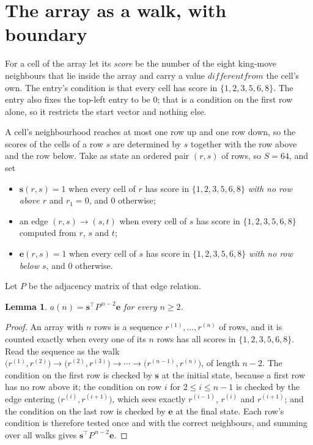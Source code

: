 \documentclass[11pt,a4paper]{article}
\theoremstyle{plain}
\newtheorem{lemma}[theorem]{Lemma}
\theoremstyle{definition}
\begin{document}
\section{The array as a walk, with boundary}

For a cell of the array let its \emph{score} be the number of the eight king-move neighbours that lie inside
the array and carry a value $different from$ the cell's own. The entry's condition is that every cell
has score in $\{1,2,3,5,6,8\}$. The entry also fixes the top-left entry to be $0$; that is a condition on the first row alone, so it restricts the start vector and nothing else.

A cell's neighbourhood reaches at most one row up and one row down, so the scores of the
cells of a row $s$ are determined by $s$ together with the row above and the row below.
Take as state an ordered pair $(r,s)$ of rows, so $S=64$, and set
\begin{itemize}
\item $\mathbf{s}(r,s)=1$ when every cell of $r$ has score in $\{1,2,3,5,6,8\}$ \emph{with no row
above $r$} and $r_1=0$, and $0$ otherwise;
\item an edge $(r,s)\to(s,t)$ when every cell of $s$ has score in $\{1,2,3,5,6,8\}$ computed from
$r$, $s$ and $t$;
\item $\mathbf{e}(r,s)=1$ when every cell of $s$ has score in $\{1,2,3,5,6,8\}$ \emph{with no row
below $s$}, and $0$ otherwise.
\end{itemize}
Let $P$ be the adjacency matrix of that edge relation.

\begin{lemma}\label{lem:walk}
$a(n)=\mathbf{s}^{\!\top}P^{\,n-2}\mathbf{e}$ for every $n\ge2$.
\end{lemma}

\begin{proof}
An array with $n$ rows is a sequence $r^{(1)},\dots,r^{(n)}$ of rows, and it is counted
exactly when every one of its $n$ rows has all scores in $\{1,2,3,5,6,8\}$. Read the sequence as the
walk $\bigl(r^{(1)},r^{(2)}\bigr)\to\bigl(r^{(2)},r^{(3)}\bigr)\to\cdots\to
\bigl(r^{(n-1)},r^{(n)}\bigr)$, of length $n-2$. The condition on the first row is
checked by $\mathbf{s}$ at the initial state, because a first row has no row above it; the
condition on row $i$ for $2\le i\le n-1$ is checked by the edge entering
$\bigl(r^{(i)},r^{(i+1)}\bigr)$, which sees exactly $r^{(i-1)}$, $r^{(i)}$ and
$r^{(i+1)}$; and the condition on the last row is checked by $\mathbf{e}$ at the final
state. Each row's condition is therefore tested once and with the correct neighbours, and
summing over all walks gives $\mathbf{s}^{\!\top}P^{\,n-2}\mathbf{e}$.
\end{proof}
\end{document}

